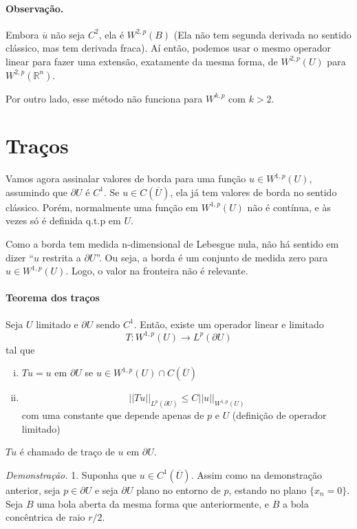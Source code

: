 \documentclass[a4paper, 11pt]{book}
\newcommand{\Rn}{{\mathbb{R}^n}}
\newcommand{\pu}{\partial U}
\begin{document}
\paragraph{Observação.} Embora $ \overline{u} $ não seja $ C^2 $, ela é $ W^{2,p}(B) $ (Ela não tem segunda derivada no sentido clássico, mas tem derivada fraca). Aí então, podemos usar o mesmo operador linear para fazer uma extensão, exatamente da mesma forma, de $ W^{2,p}(U) $ para $ W^{2,p}(\Rn) $.

Por outro lado, esse método não funciona para $ W^{k,p} $ com $ k>2 $.




\section{Traços}

Vamos agora assinalar valores de borda para uma função $u \in W^{1,p}(U)$, assumindo que $\pu$ é $C^1$. Se $u \in C(\overline{U})$, ela já tem valores de borda no sentido clássico. Porém, normalmente uma função em $W^{1,p}(U)$ não é contínua, e às vezes só é definida q.t.p em $U$. 

Como a borda tem medida n-dimensional de Lebesgue nula, não há sentido em dizer ``$ u $ restrita a $ \pu $''. Ou seja, a borda é um conjunto de medida zero para $u \in W^{1,p}(U)$. Logo, o valor na fronteira não é relevante.





\paragraph{Teorema dos traços} Seja $U$ limitado e $\pu$ sendo $C^1$. Então, existe um operador linear e limitado \[ T:W^{1,p}(U)\rightarrow L^p(\pu) \] tal que \begin{enumerate}[(i)]
	\item $Tu = u$ em $\pu$ se $u \in W^{1,p}(U) \cap C(\overline{U})$
	\item \[ || Tu ||_{L^p(\pu)} \leq C ||u||_{W^{1,p}(U)} \] com uma constante que depende apenas de $p$ e $U$ (definição de operador limitado)
\end{enumerate} $Tu$ é chamado de traço de $u$ em $\pu$.

\textit{Demonstração.} 1. Suponha que $u \in C^1(\overline{U})$. Assim como na demonstração anterior, seja $p \in \pu$ e seja $\pu$ plano no entorno de $p$, estando no plano $\{x_n=0\}$. Seja $B$ uma bola aberta da mesma forma que anteriormente, e $\hat{B}$ a bola concêntrica de raio $r/2$.
\end{document}
